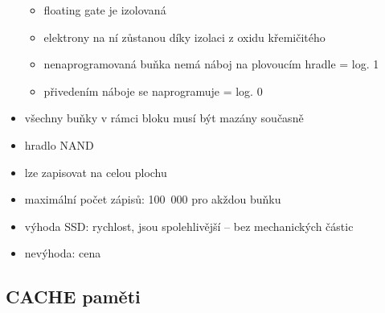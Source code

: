 \documentclass[a4paper,12pt]{article}
\providecommand{\tightlist}{%
\setlength{\itemsep}{0pt}\setlength{\parskip}{0pt}}
\begin{document}
\begin{itemize}
\begin{minipage}[b]{0.6\textwidth}
    \begin{itemize}
      \tightlist
      \item floating gate je izolovaná
      \item elektrony na ní zůstanou díky izolaci z oxidu křemičitého
      \item nenaprogramovaná buňka nemá náboj na plovoucím hradle = log. 1
      \item přivedením náboje se naprogramuje = log. 0
    \end{itemize}
  \end{minipage}
  \item všechny buňky v rámci bloku musí být mazány současně
  \item hradlo NAND
  \item lze zapisovat na celou plochu
  \item maximální počet zápisů: 100~000 pro akždou buňku
  \item výhoda SSD: rychlost, jsou spolehlivější -- bez mechanických částic
  \item nevýhoda: cena
\end{itemize}

\subsection{CACHE paměti}
\end{document}
